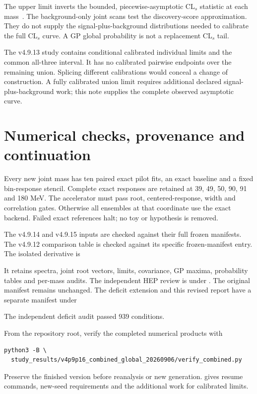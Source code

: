 \documentclass[11pt]{article}
\begin{document}
The upper limit inverts the bounded, piecewise-asymptotic CL$_s$ statistic at each mass~\cite{cowan}. The background-only joint scans test the discovery-score approximation. They do not supply the signal-plus-background distributions needed to calibrate the full CL$_s$ curve. A GP global probability is not a replacement CL$_s$ tail.

The v4.9.13 study contains conditional calibrated individual limits and the common all-three interval. It has no calibrated pairwise endpoints over the remaining union. Splicing different calibrations would conceal a change of construction. A fully calibrated union limit requires additional declared signal-plus-background work; this note supplies the complete observed asymptotic curve.

\clearpage
\section{Numerical checks, provenance and continuation}


Every new joint mass has ten paired exact pilot fits, an exact baseline and a fixed bin-response stencil. Complete exact responses are retained at 39, 49, 50, 90, 91 and 180 MeV. The accelerator must pass root, centered-response, width and correlation gates. Otherwise all ensembles at that coordinate use the exact backend. Failed exact references halt; no toy or hypothesis is removed.

The v4.9.14 and v4.9.15 inputs are checked against their full frozen manifests. The v4.9.12 comparison table is checked against its specific frozen-manifest entry. The isolated derivative is
\begin{center}\small{}\end{center}
It retains spectra, joint root vectors, limits, covariance, GP maxima, probability tables and per-mass audits. The independent HEP review is under . The original manifest remains unchanged. The deficit extension and this revised report have a separate manifest under
\begin{center}\small{}\end{center}
The independent deficit audit passed 939 conditions.

From the repository root, verify the completed numerical products with
\begin{verbatim}
python3 -B \
  study_results/v4p9p16_combined_global_20260906/verify_combined.py
\end{verbatim}
Preserve the finished version before reanalysis or new generation.  gives resume commands, new-seed requirements and the additional work for calibrated limits.
\end{document}
